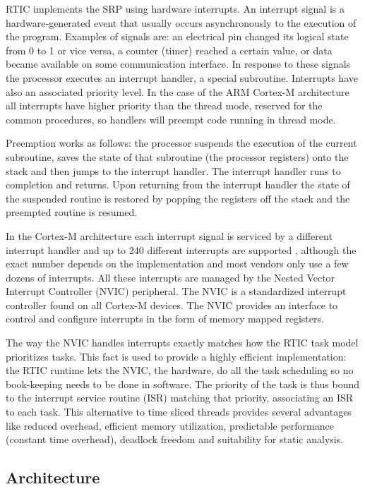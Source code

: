 \documentclass{ieeeaccess}
\begin{document}
RTIC implements the SRP using hardware interrupts. An interrupt signal is a hardware-generated event that usually occurs asynchronously to the execution of the program. Examples of signals are: an electrical pin changed its logical state from 0 to 1 or vice versa, a counter (timer) reached a certain value, or data became available on some communication interface. In response to these signals the processor executes an interrupt handler, a special subroutine. Interrupts have also an associated priority level. In the case of the ARM Cortex-M architecture all interrupts have higher priority than the thread mode, reserved for the common procedures, so handlers will preempt code running in thread mode.

Preemption works as follows: the processor suspends the execution of the current subroutine, saves the state of that subroutine (the processor registers) onto the stack and then jumps to the interrupt handler. The interrupt handler runs to completion and returns. Upon returning from the interrupt handler the state of the suspended routine is restored by popping the registers off the stack and the preempted routine is resumed.

In the Cortex-M architecture each interrupt signal is serviced by a different interrupt handler and up to 240 different interrupts are supported \cite{definitive-guide-cortex}, although the exact number depends on the implementation and most vendors only use a few dozens of interrupts. All these interrupts are managed by the Nested Vector Interrupt Controller (NVIC) peripheral. The NVIC is a standardized interrupt controller found on all Cortex-M devices. The NVIC provides an interface to control and configure interrupts in the form of memory mapped registers.

The way the NVIC handles interrupts \cite{interrupts-handling} exactly matches how the RTIC task model prioritizes tasks. This fact is used to provide a highly efficient implementation: the RTIC runtime lets the NVIC, the hardware, do all the task scheduling so no book-keeping needs to be done in software. The priority of the task is thus bound to the interrupt service routine (ISR) matching that priority, associating an ISR to each task. This alternative to time sliced threads provides several advantages like reduced overhead, efficient memory utilization, predictable performance (constant time overhead), deadlock freedom and suitability for static analysis.

\subsection{Architecture}
\end{document}
